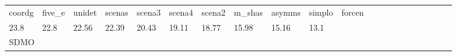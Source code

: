 \begin{table}
\begin{center}
\begin{tabular}{lllllllllllllllllllll}
    
    
    coordg
    
    
    &
    
    five_e
    
    
    &
    
    unidet
    
    
    &
    
    scenas
    
    
    &
    
    scena3
    
    
    &
    
    scena4
    
    
    &
    
    scena2
    
    
    &
    
    m_shas
    
    
    &
    
    asymms
    
    
    &
    
    simplo
    
    
    &
    
    forcen
     \\

    
    
    23.8
    
    
    &
    
    22.8
    
    
    &
    
    22.56
    
    
    &
    
    22.39
    
    
    &
    
    20.43
    
    
    &
    
    19.11
    
    
    &
    
    18.77
    
    
    &
    
    15.98
    
    
    &
    
    15.16
    
    
    &
    
    13.1
    
    
    &
    
    
     \\


\hline
\multicolumn{ 11 }{l}{ SDMO }\\ \hline



\end{tabular}
\end{center}
\end{table}
